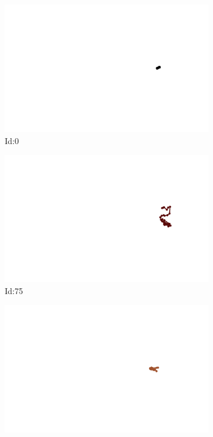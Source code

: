 \documentclass[12pt,twoside]{report}
\begin{document}
\begin{figure}
\centering
\begin{subfigure}[b]{0.20\textwidth}
\centering
\includegraphics[width=\textwidth]{../../trajectories/0.png}
\caption{Id:0}
\end{subfigure}
\begin{subfigure}[b]{0.20\textwidth}
\centering
\includegraphics[width=\textwidth]{../../trajectories/75.png}
\caption{Id:75}
\end{subfigure}
\begin{subfigure}[b]{0.20\textwidth}
\centering
\includegraphics[width=\textwidth]{../../trajectories/191.png}

\end{subfigure}
\end{figure}
\end{document}
